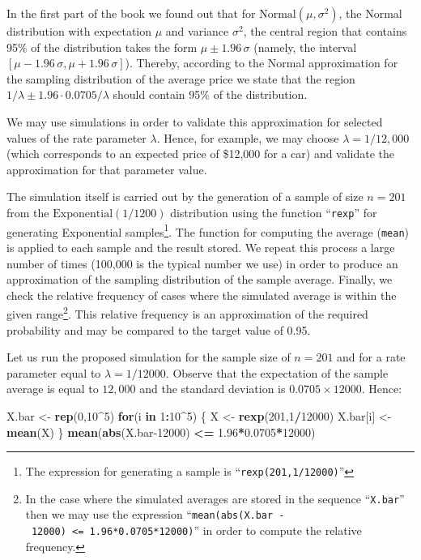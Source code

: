 \documentclass[
]{krantz}
\makeatletter
\newenvironment{Shaded}{\begin{snugshade}}{\end{snugshade}}
\newcommand{\ControlFlowTok}[1]{\textcolor[rgb]{0.13,0.29,0.53}{\textbf{#1}}}
\newcommand{\DecValTok}[1]{\textcolor[rgb]{0.00,0.00,0.81}{#1}}
\newcommand{\FloatTok}[1]{\textcolor[rgb]{0.00,0.00,0.81}{#1}}
\newcommand{\KeywordTok}[1]{\textcolor[rgb]{0.13,0.29,0.53}{\textbf{#1}}}
\newcommand{\NormalTok}[1]{#1}
\newcommand{\OperatorTok}[1]{\textcolor[rgb]{0.81,0.36,0.00}{\textbf{#1}}}
\newcommand{\StringTok}[1]{\textcolor[rgb]{0.31,0.60,0.02}{#1}}
\newenvironment{kframe}{%
\medskip{}
\setlength{\fboxsep}{.8em}
 \def\at@end@of@kframe{}%
 \ifinner\ifhmode%
  \def\at@end@of@kframe{\end{minipage}}%
  \begin{minipage}{\columnwidth}%
 \fi\fi%
 \def\FrameCommand##1{\hskip\@totalleftmargin \hskip-\fboxsep
 \colorbox{shadecolor}{##1}\hskip-\fboxsep
     \hskip-\linewidth \hskip-\@totalleftmargin \hskip\columnwidth}%
 \MakeFramed {\advance\hsize-\width
   \@totalleftmargin\z@ \linewidth\hsize
   \@setminipage}}%
 {\par\unskip\endMakeFramed%
 \at@end@of@kframe}
\renewenvironment{Shaded}{\begin{kframe}}{\end{kframe}}
\theoremstyle{definition}
\theoremstyle{definition}
\theoremstyle{definition}
\theoremstyle{remark}
\makeatother
\begin{document}
In the first part of the book we found out that for
\(\mathrm{Normal}(\mu,\sigma^2)\), the Normal distribution with
expectation \(\mu\) and variance \(\sigma^2\), the central region that
contains 95\% of the distribution takes the form \(\mu \pm 1.96\, \sigma\)
(namely, the interval \([\mu-1.96\,\sigma,\mu + 1.96\, \sigma]\)).
Thereby, according to the Normal approximation for the sampling
distribution of the average price we state that the region
\(1/\lambda \pm 1.96 \cdot 0.0705/\lambda\) should contain 95\% of the
distribution.

We may use simulations in order to validate this approximation for
selected values of the rate parameter \(\lambda\). Hence, for example, we
may choose \(\lambda = 1/12,000\) (which corresponds to an expected price
of \$12,000 for a car) and validate the approximation for that parameter
value.

The simulation itself is carried out by the generation of a sample of
size \(n=201\) from the \(\mathrm{Exponential}(1/1200)\) distribution using
the function ``\texttt{rexp}'' for generating Exponential samples\footnote{The expression for generating a sample is ``\texttt{rexp(201,1/12000)}''}. The
function for computing the average (\texttt{mean}) is applied to each sample
and the result stored. We repeat this process a large number of times
(100,000 is the typical number we use) in order to produce an
approximation of the sampling distribution of the sample average.
Finally, we check the relative frequency of cases where the simulated
average is within the given range\footnote{In the case where the simulated averages are stored in the
  sequence ``\texttt{X.bar}'' then we may use the expression
  ``\texttt{mean(abs(X.bar\ -\ 12000)\ \textless{}=\ 1.96*0.0705*12000)}'' in order to
  compute the relative frequency.}. This relative frequency is an
approximation of the required probability and may be compared to the
target value of 0.95.

Let us run the proposed simulation for the sample size of \(n=201\) and
for a rate parameter equal to \(\lambda = 1/12000\). Observe that the
expectation of the sample average is equal to \(12,000\) and the standard
deviation is \(0.0705\times 12000\). Hence:

\begin{Shaded}
\begin{Highlighting}[]
\NormalTok{X.bar <-}\StringTok{ }\KeywordTok{rep}\NormalTok{(}\DecValTok{0}\NormalTok{,}\DecValTok{10}\OperatorTok{^}\DecValTok{5}\NormalTok{)}
\ControlFlowTok{for}\NormalTok{(i }\ControlFlowTok{in} \DecValTok{1}\OperatorTok{:}\DecValTok{10}\OperatorTok{^}\DecValTok{5}\NormalTok{) \{}
\NormalTok{  X <-}\StringTok{ }\KeywordTok{rexp}\NormalTok{(}\DecValTok{201}\NormalTok{,}\DecValTok{1}\OperatorTok{/}\DecValTok{12000}\NormalTok{)}
\NormalTok{  X.bar[i] <-}\StringTok{ }\KeywordTok{mean}\NormalTok{(X)}
\NormalTok{\}}
\KeywordTok{mean}\NormalTok{(}\KeywordTok{abs}\NormalTok{(X.bar}\DecValTok{-12000}\NormalTok{) }\OperatorTok{<=}\StringTok{ }\FloatTok{1.96}\OperatorTok{*}\FloatTok{0.0705}\OperatorTok{*}\DecValTok{12000}\NormalTok{)}
\end{Highlighting}
\end{Shaded}
\end{document}
